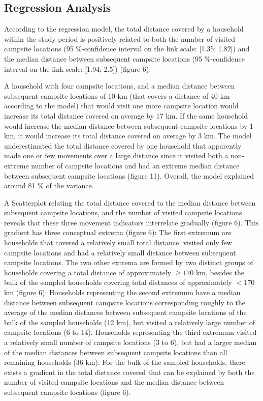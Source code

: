 \documentclass[]{elsarticle} %
\begin{document}
\hypertarget{regression-analysis-1}{%
\subsection{Regression Analysis}\label{regression-analysis-1}}

According to the regression model, the total distance covered by a
household within the study period is positively related to both the
number of visited campsite locations (95 \%-confidence interval on the
link scale: {[}1.35; 1.82{]}) and the median distance between subsequent
campsite locations (95 \%-confidence interval on the link scale:
{[}1.94; 2.5{]}) (figure 6):

A household with four campsite locations, and a median distance between
subsequent campsite locations of 10 km (that covers a distance of 40 km
according to the model) that would visit one more campsite location
would increase its total distance covered on average by 17 km. If the
same household would increase the median distance between subsequent
campsite locations by 1 km, it would increase its total distance covered
on average by 3 km. The model underestimated the total distance covered
by one household that apparently made one or few movements over a large
distance since it visited both a non-extreme number of campsite
locations and had an extreme median distance between subsequent campsite
locations (figure 11). Overall, the model explained around 81 \% of the
variance.

A Scatterplot relating the total distance covered to the median distance
between subsequent campsite locations, and the number of visited
campsite locations reveals that these three movement indicators
interrelate gradually (figure 6). This gradient has three conceptual
extrema (figure 6): The first extremum are households that covered a
relatively small total distance, visited only few campsite locations and
had a relatively small distance between subsequent campsite locations.
The two other extrema are formed by two distinct groups of households
covering a total distance of approximately \(\ge170\) km, besides the
bulk of the sampled households covering total distances of approximately
\(<170\) km (figure 6): Households representing the second extremum have
a median distance between subsequent campsite locations corresponding
roughly to the average of the median distances between subsequent
campsite locations of the bulk of the sampled households (12 km), but
visited a relatively large number of campsite locations (6 to 14).
Households representing the third extremum visited a relatively small
number of campsite locations (3 to 6), but had a larger median of the
median distances between subsequent campsite locations than all
remaining households (36 km). For the bulk of the sampled households,
there exists a gradient in the total distance covered that can be
explained by both the number of visited campsite locations and the
median distance between subsequent campsite locations (figure 6).
\end{document}
